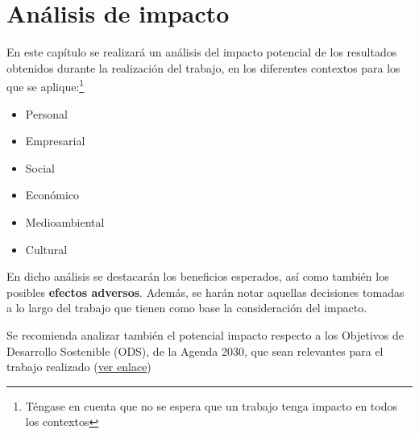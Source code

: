 \chapter{Análisis de impacto}
En este capítulo se realizará un análisis del impacto potencial de los resultados obtenidos durante la realización del trabajo, en los diferentes contextos para los que se aplique:\footnote{Téngase en cuenta que no se espera que un trabajo tenga impacto en todos los contextos}

\begin{itemize}
\item Personal
\item Empresarial
\item Social
\item Económico
\item Medioambiental
\item Cultural
\end{itemize}

En dicho análisis se destacarán los beneficios esperados, así como también los posibles \textbf{efectos adversos}.
Además, se harán notar aquellas decisiones tomadas a lo largo del trabajo que tienen como base la consideración del impacto.

Se recomienda analizar también el potencial impacto respecto a los Objetivos de Desarrollo Sostenible (ODS), de la Agenda 2030, que sean relevantes para el trabajo realizado (\href{https://www.un.org/sustainabledevelopment/es/objetivos-de-desarrollo-sostenible/}{ver enlace})
